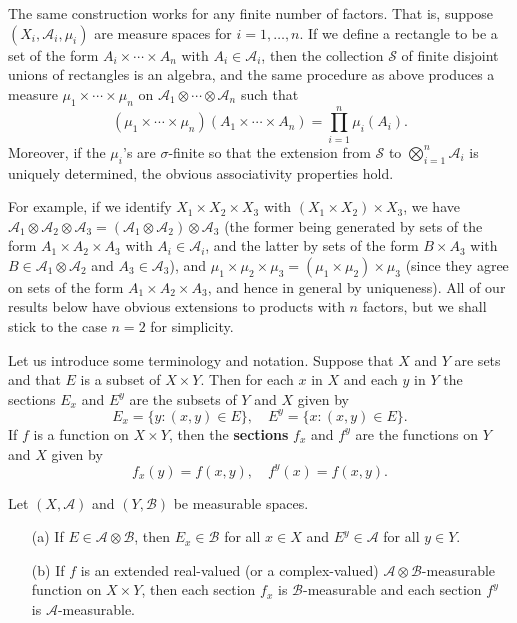 The same construction works for any finite number of factors. That is, suppose $(X_i,\mathcal{A}_i,\mu_i)$ are measure spaces for $i=1,\dots,n$. If we define a rectangle to be a set of the form $A_i\times\cdots\times A_n$ with $A_i\in\mathcal{A}_i$, then the collection $\mathcal{S}$ of finite disjoint unions of rectangles is an algebra, and the same procedure as above produces a measure $\mu_1\times\cdots\times\mu_n$ on $\mathcal{A}_1\otimes\cdots\otimes\mathcal{A}_n$ such that
\[(\mu_1\times\cdots\times\mu_n)(A_1\times\cdots\times A_n)=\prod_{i=1}^{n}\mu_i(A_i).\]
Moreover, if the $\mu_i$'s are $\sigma$-finite so that the extension from $\mathcal{S}$ to $\bigotimes_{i=1}^{n}\mathcal{A}_i$ is uniquely determined, the obvious associativity properties hold.\par
For example, if we identify $X_1\times X_2\times X_3$ with $(X_1\times X_2)\times X_3$, we have $\mathcal{A}_1\otimes\mathcal{A}_2\otimes\mathcal{A}_3=(\mathcal{A}_1\otimes\mathcal{A}_2)\otimes\mathcal{A}_3$ (the former being generated by sets of the form $A_1\times A_2\times A_3$ with $A_i\in\mathcal{A}_i$, and the latter by sets of the form $B\times A_3$ with $B\in\mathcal{A}_1\otimes\mathcal{A}_2$ and $A_3\in\mathcal{A}_3$), and $\mu_1\times\mu_2\times\mu_3=(\mu_1\times\mu_2)\times\mu_3$ (since they agree on sets of the form $A_1\times A_2\times A_3$, and hence in general by uniqueness). All of our results below have obvious extensions to products with $n$ factors, but we shall stick to the case $n=2$ for simplicity.\par
Let us introduce some terminology and notation. Suppose that $X$ and $Y$ are sets and that $E$ is a subset of $X\times Y$. Then for each $x$ in $X$ and each $y$ in $Y$ the sections $E_x$ and $E^y$ are the subsets of $Y$ and $X$ given by
\[E_x=\{y:(x,y)\in E\},\quad E^y=\{x:(x,y)\in E\}.\]
If $f$ is a function on $X\times Y$, then the \textbf{sections} $f_x$ and $f^y$ are the functions on $Y$ and $X$ given by
\[f_x(y)=f(x,y),\quad f^y(x)=f(x,y).\]
\begin{lemma}\label{measurability of section}
Let $(X,\mathcal{A})$ and $(Y,\mathcal{B})$ be measurable spaces.
\begin{itemize}
\item[(a)] If $E\in\mathcal{A}\otimes\mathcal{B}$, then $E_x\in\mathcal{B}$ for all $x\in X$ and $E^y\in\mathcal{A}$ for all $y\in Y$.
\item[(b)] If $f$ is an extended real-valued (or a complex-valued) $\mathcal{A}\otimes\mathcal{B}$-measurable function on $X\times Y$, then each section $f_x$ is $\mathcal{B}$-measurable and each section $f^y$ is $\mathcal{A}$-measurable.
\end{itemize}
\end{lemma}
